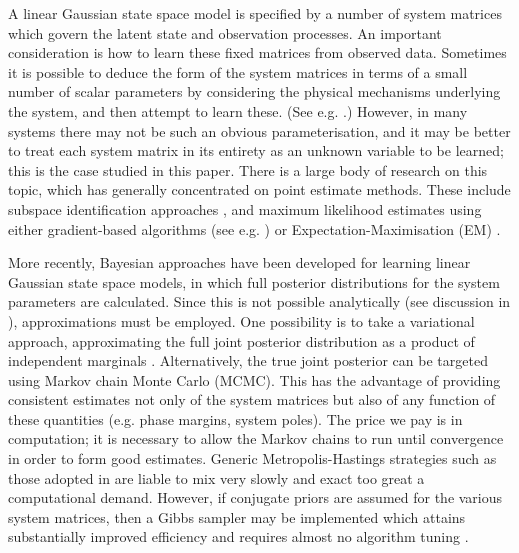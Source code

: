 \documentclass[journal,10pt]{IEEEtran}
\begin{document}
A linear Gaussian state space model is specified by a number of system matrices which govern the latent state and observation processes. An important consideration is how to learn these fixed matrices from observed data. Sometimes it is possible to deduce the form of the system matrices in terms of a small number of scalar parameters by considering the physical mechanisms underlying the system, and then attempt to learn these. (See e.g. \cite{Kantas2009,Andrieu2010}.) However, in many systems there may not be such an obvious parameterisation, and it may be better to treat each system matrix in its entirety as an unknown variable to be learned; this is the case studied in this paper. There is a large body of research on this topic, which has generally concentrated on point estimate methods. These include subspace identification approaches \cite{VanOverschee1991,Viberg1995}, and maximum likelihood estimates using either gradient-based algorithms (see e.g. \cite{Cappe2005,Sarkka2013}) or Expectation-Maximisation (EM) \cite{Shumway1982,Digalakis1993,Ghahramani1996,Gibson2005,Li2009}.

More recently, Bayesian approaches have been developed for learning linear Gaussian state space models, in which full posterior distributions for the system parameters are calculated. Since this is not possible analytically (see discussion in \cite{Beal2003}), approximations must be employed. One possibility is to take a variational approach, approximating the full joint posterior distribution as a product of independent marginals \cite{Ghahramani2001,Beal2003,Barber2007}. Alternatively, the true joint posterior can be targeted using Markov chain Monte Carlo (MCMC). This has the advantage of providing consistent estimates not only of the system matrices but also of any function of these quantities (e.g. phase margins, system poles). The price we pay is in computation; it is necessary to allow the Markov chains to run until convergence in order to form good estimates. Generic Metropolis-Hastings strategies such as those adopted in \cite{Ninness2010} are liable to mix very slowly and exact too great a computational demand. However, if conjugate priors are assumed for the various system matrices, then a Gibbs sampler may be implemented which attains substantially improved efficiency and requires almost no algorithm tuning \cite{Wills2012}.
\end{document}
